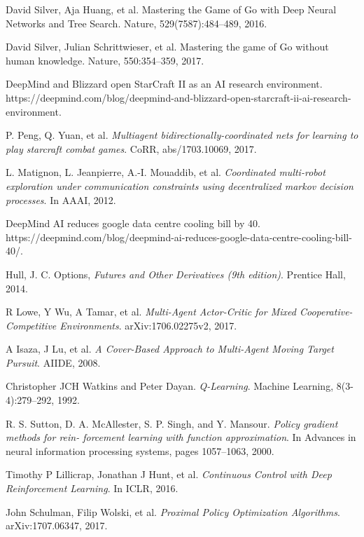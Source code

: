 \documentclass[11pt,twocolumn]{jarticle} %
\begin{document}
\begin{thebibliography}{9}

David Silver, Aja Huang, et al. Mastering the Game of Go with Deep Neural Networks and Tree Search. Nature, 529(7587):484–489, 2016.

David Silver, Julian Schrittwieser, et al. Mastering the game of Go without human knowledge. Nature, 550:354–359, 2017.

DeepMind and Blizzard open StarCraft II as an AI research environment. https://deepmind.com/blog/deepmind-and-blizzard-open-starcraft-ii-ai-research-environment.

 P. Peng, Q. Yuan, et al. \textsl{Multiagent bidirectionally-coordinated nets for learning to play starcraft combat games}. CoRR, abs/1703.10069, 2017.

L. Matignon, L. Jeanpierre, A.-I. Mouaddib, et al. \textsl{Coordinated multi-robot exploration under
communication constraints using decentralized markov decision processes}. In AAAI, 2012.

DeepMind AI reduces google data centre cooling bill by 40. https://deepmind.com/blog/deepmind-ai-reduces-google-data-centre-cooling-bill-40/.

Hull, J. C. Options, \textsl{Futures and Other Derivatives (9th edition)}. Prentice Hall, 2014.

R Lowe, Y Wu, A Tamar, et al. \textsl{Multi-Agent Actor-Critic for Mixed Cooperative-Competitive Environments}. arXiv:1706.02275v2, 2017.

A Isaza, J Lu, et al. \textsl{A Cover-Based Approach to Multi-Agent Moving Target Pursuit}. AIIDE, 2008.

Christopher JCH Watkins and Peter Dayan. \textsl{Q-Learning}. Machine Learning, 8(3-4):279–292, 1992.

R. S. Sutton, D. A. McAllester, S. P. Singh, and Y. Mansour. \textsl{Policy gradient methods for rein-
forcement learning with function approximation}. In Advances in neural information processing systems, pages 1057–1063, 2000.

Timothy P Lillicrap, Jonathan J Hunt, et al. \textsl{Continuous Control with Deep Reinforcement Learning}. In ICLR, 2016.

John Schulman, Filip Wolski, et al. \textsl{Proximal Policy Optimization Algorithms}. arXiv:1707.06347, 2017.


\end{thebibliography}
\end{document}
